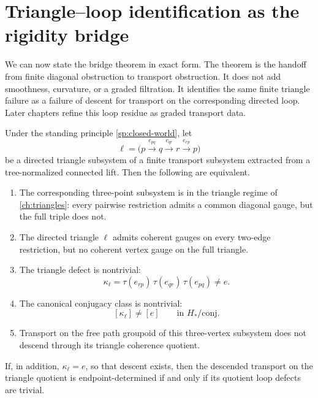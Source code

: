 \section{Triangle--loop identification as the rigidity bridge}
We can now state the bridge theorem in exact form.
The theorem is the handoff from finite diagonal obstruction to transport
obstruction.  It does not add smoothness, curvature, or a graded
filtration.  It identifies the same finite triangle failure as a failure
of descent for transport on the corresponding directed loop.  Later
chapters refine this loop residue as graded transport data.
\begin{theorem}
	\label{thm:bridge-main}
	Under the standing principle \cref{sp:closed-world}, let
	\[
		\ell=
		\bigl(
		p\xrightarrow{e_{pq}}q\xrightarrow{e_{qr}}r\xrightarrow{e_{rp}}p
		\bigr)
	\]
	be a directed triangle subsystem of a finite transport subsystem
	extracted from a tree-normalized connected lift. Then the following
	are equivalent.
	\begin{enumerate}[label=\textup{(\arabic*)}]
		\item The corresponding three-point subsystem is in the triangle regime
		      of \cref{ch:triangles}: every pairwise restriction admits a common
		      diagonal gauge, but the full triple does not.
		\item The directed triangle \(\ell\) admits coherent gauges on every
		      two-edge restriction, but no coherent vertex gauge on the full
		      triangle.
		\item The triangle defect is nontrivial:
		      \[
			      \kappa_\ell=\tau(e_{rp})\,\tau(e_{qr})\,\tau(e_{pq})\neq e.
		      \]
		\item The canonical conjugacy class is nontrivial:
		      \[
			      [\kappa_\ell]\neq [e]
			      \qquad
			      \text{in }H_*/\mathrm{conj}.
		      \]
		\item Transport on the free path groupoid of this three-vertex
		      subsystem does not descend through its triangle coherence quotient.
	\end{enumerate}
	If, in addition, \(\kappa_\ell=e\), so that descent exists, then the
	descended transport on the triangle quotient is endpoint-determined if
	and only if its quotient loop defects are trivial.
\end{theorem}

